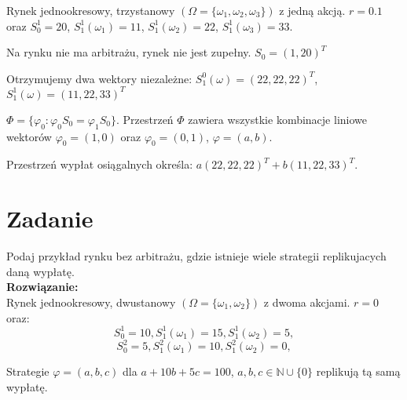 \documentclass{article}
\newcommand*{\field}[1]{\mathbb{#1}}%
\begin{document}
Rynek jednookresowy, trzystanowy $(\Omega = \{\omega_{1},\omega_{2}, \omega_{3}\})$ z jedną akcją. $r = 0.1$ oraz $S_{0}^{1} = 20$, $S_{1}^{1}(\omega_{1}) = 11$, $S_{1}^{1}(\omega_{2}) = 22$, $S_{1}^{1}(\omega_{3}) = 33$.

Na rynku nie ma arbitrażu, rynek nie jest zupełny.
$S_{0} = (1, 20)^{T}$

Otrzymujemy dwa wektory niezależne: $ S_{1}^{0}(\omega) = (22, 22, 22)^{T}$, $S_{1}^{1}(\omega) = (11, 22, 33)^{T}$

$\Phi = \{\varphi_{0}: \varphi_{0}S_{0} = \varphi_{1}S_{0}\}$. Przestrzeń $\Phi$ zawiera wszystkie kombinacje liniowe wektorów $\varphi_{0} = (1, 0)$ oraz $\varphi_{0} = (0, 1)$, $\varphi = (a,b)$.

Przestrzeń wypłat osiągalnych określa: $a(22, 22, 22)^{T} + b(11, 22, 33)^{T}$.

\section{Zadanie} 
 Podaj przykład rynku bez arbitrażu, gdzie istnieje wiele strategii replikujacych daną wypłatę. \\
 
\textbf{Rozwiązanie:} \\
Rynek jednookresowy, dwustanowy $(\Omega = \{\omega_{1},\omega_{2}\})$ z dwoma akcjami. $r=0$ oraz:
$$S_{0}^{1} = 10, S_{1}^{1}(\omega_{1}) = 15, S_{1}^{1}(\omega_{2}) = 5,$$ 
$$S_{0}^{2} = 5, S_{1}^{2}(\omega_{1}) = 10, S_{1}^{2}(\omega_{2}) = 0,$$ 

Strategie $\varphi = (a, b, c)$ dla $a + 10b + 5c = 100$, $a,b,c \in \field{N}\cup \{0\}$ replikują tą samą wypłatę.
\end{document}
